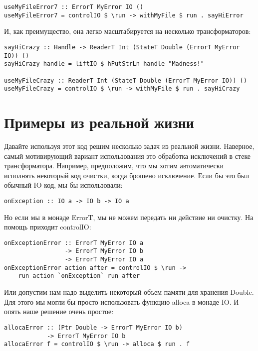 \begin{lstlisting}
useMyFileError7 :: ErrorT MyError IO ()
useMyFileError7 = controlIO $ \run -> withMyFile $ run . sayHiError
\end{lstlisting}

И, как преимущество, она легко масштабируется на несколько трансформаторов:

\begin{lstlisting}
sayHiCrazy :: Handle -> ReaderT Int (StateT Double (ErrorT MyError IO)) ()
sayHiCrazy handle = liftIO $ hPutStrLn handle "Madness!"

useMyFileCrazy :: ReaderT Int (StateT Double (ErrorT MyError IO)) ()
useMyFileCrazy = controlIO $ \run -> withMyFile $ run . sayHiCrazy
\end{lstlisting}

\section{Примеры из реальной жизни}

Давайте используя этот код решим несколько задач из реальной жизни. Наверное, самый мотивирующий вариант использования это обработка исключений в стеке трансформатора. Например, предположим, что мы хотим автоматически исполнять некоторый код очистки, когда брошено исключение. Если бы это был обычный IO код, мы бы использовали:

\begin{lstlisting}
onException :: IO a -> IO b -> IO a
\end{lstlisting}

Но если мы в монаде ErrorT, мы не можем передать ни действие ни очистку. На помощь приходит controlIO:

\begin{lstlisting}
onExceptionError :: ErrorT MyError IO a
                 -> ErrorT MyError IO b
                 -> ErrorT MyError IO a
onExceptionError action after = controlIO $ \run ->
    run action `onException` run after
\end{lstlisting}

Или допустим нам надо выделить некоторый объем памяти для хранения Double. Для этого мы могли бы просто использовать функцию alloca в монаде IO. И опять наше решение очень простое:

\begin{lstlisting}
allocaError :: (Ptr Double -> ErrorT MyError IO b)
            -> ErrorT MyError IO b
allocaError f = controlIO $ \run -> alloca $ run . f
\end{lstlisting}

